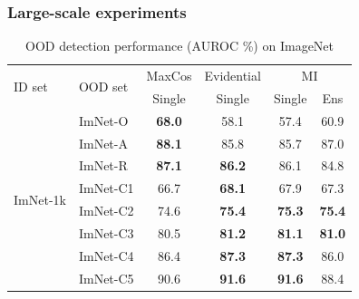 \documentclass[]{beamer}
\begin{document}
\begin{frame} \frametitle{Large-scale experiments}
\begin{table}[H]
    \begin{center}
    \caption{OOD detection performance (AUROC \%) on ImageNet}
    \begin{small}
        \begin{tabular}{ l l | c | c | c c }
            \toprule
            \multirow{2}{*}{ID set} & \multirow{2}{*}{OOD set} & \multicolumn{1}{c|}{MaxCos} & \multicolumn{1}{c|}{Evidential} & \multicolumn{2}{c}{MI} \\
            & & Single & Single & Single & Ens \\
            \midrule
            \multirow{8}{*}{ImNet-1k}
            & ImNet-O    & \bf{68.0} %
                         & 58.1 %
                         & 57.4 & 60.9 \\ %
            & ImNet-A    & \bf{88.1} %
                         & 85.8 %
                         & 85.7 & 87.0 \\ %
            & ImNet-R    & \bf{87.1} %
                         & \bf{86.2} %
                         & 86.1 & 84.8 \\ %
            & ImNet-C1   & 66.7 %
                         & \bf{68.1} %
                         & 67.9 & 67.3 \\ %
            & ImNet-C2   & 74.6 %
                         & \bf{75.4} %
                         & \bf{75.3} & \bf{75.4} \\ %
            & ImNet-C3   & 80.5 %
                         & \bf{81.2} %
                         & \bf{81.1} & \bf{81.0} \\ %
            & ImNet-C4   & 86.4 %
                         & \bf{87.3} %
                         & \bf{87.3} & 86.0 \\ %
            & ImNet-C5   & 90.6 %
                         & \bf{91.6} %
                         & \bf{91.6} & 88.4 \\ %
            \bottomrule
        \end{tabular}
    \end{small}
    \end{center}
\end{table}
\end{frame}
\end{document}
